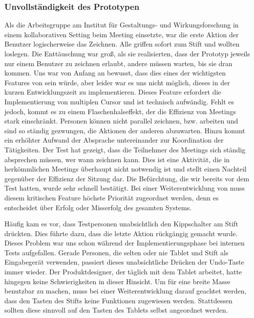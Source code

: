 \subsubsection{Unvollständigkeit des Prototypen}
Als die Arbeitsgruppe am Institut für Gestaltungs- und Wirkungsforschung \scribbler in einem kollaborativen Setting beim Meeting einsetzte, war die erste Aktion der Benutzer logischerweise das Zeichnen. Alle griffen sofort zum Stift und wollten loslegen. Die Enttäuschung war groß, als sie realisierten, dass der Prototyp jeweils nur einem Benutzer zu zeichnen erlaubt, andere müssen warten, bis sie dran kommen. Uns war von Anfang an bewusst, dass dies eines der wichtigsten Features von \scribbler sein würde, aber leider war es uns nicht möglich, dieses in der kurzen Entwicklungszeit zu implementieren. Dieses Feature erfordert die Implementierung von multiplen Cursor und ist technisch aufwändig. Fehlt es jedoch, kommt es zu einem Flaschenhalseffekt, der die Effizienz von Meetings stark einschränkt. Personen können nicht parallel zeichnen, bzw. arbeiten und sind so ständig gezwungen, die Aktionen der anderen abzuwarten. Hinzu kommt ein erhöhter Aufwand der Absprache untereinander zur Koordination der Tätigkeiten. Der Test hat gezeigt, dass die Teilnehmer des Meetings sich ständig absprechen müssen, wer wann zeichnen kann. Dies ist eine Aktivität, die in herkömmlichen Meetings überhaupt nicht notwendig ist und stellt einen Nachteil gegenüber der Effizienz der Sitzung dar. Die Befürchtung, die wir bereits vor dem Test hatten, wurde sehr schnell bestätigt. Bei einer Weiterentwicklung von \scribbler muss diesem kritischen Feature höchste Priorität zugeordnet werden, denn es entscheidet über Erfolg oder Misserfolg des gesamten Systems.

\medskip Häufig kam es vor, dass Testpersonen unabsichtlich den Kippschalter am Stift drückten. Dies führte dazu, dass die letzte Aktion rückgängig gemacht wurde. Dieses Problem war uns schon während der Implementierungsphase bei internen Tests aufgefallen. Gerade Personen, die selten oder nie Tablet und Stift als Eingabegerät verwenden, passiert dieses unabsichtliche Drücken der Undo-Taste immer wieder. Der Produktdesigner, der täglich mit dem Tablet arbeitet, hatte hingegen keine Schwierigkeiten in dieser Hinsicht. Um \scribbler für eine breite Masse benutzbar zu machen, muss bei einer Weiterentwicklung darauf geachtet werden, dass den Tasten des Stifts keine Funktionen zugewiesen werden. Stattdessen sollten diese sinnvoll auf den Tasten des Tablets selbst angeordnet werden.

